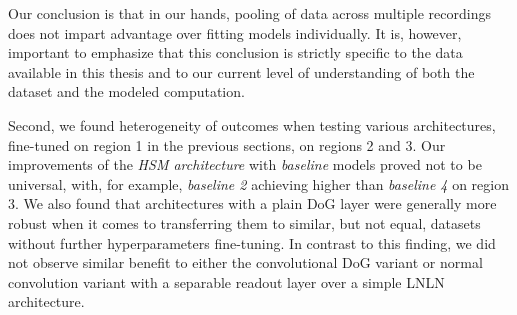 Our conclusion is that in our hands, pooling of data across multiple recordings does not impart advantage over fitting models individually. It is, however, important to emphasize that this conclusion is strictly specific to the data available in this thesis and to our current level of understanding of both the dataset and the modeled computation.

Second, we found heterogeneity of outcomes when testing various architectures, fine-tuned on {region 1} in the previous sections, on {regions 2} and {3}. Our improvements of the \textit{HSM architecture} with \textit{baseline} models proved not to be universal, with, for example, \textit{baseline 2} achieving higher than \textit{baseline 4} on {region 3}. We also found that architectures with a {plain DoG layer} were generally more robust when it comes to transferring them to similar, but not equal, datasets without further hyperparameters fine-tuning. In contrast to this finding, we did not observe similar benefit to either the {convolutional DoG} variant or {normal convolution} variant with a {separable readout layer} over a simple {LNLN architecture}.

\setlength{\abovecaptionskip}{10pt plus 0pt minus 0pt} %